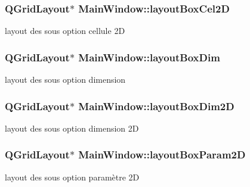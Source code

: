 \subsubsection[{\texorpdfstring{layout\+Box\+Cel2D}{layoutBoxCel2D}}]{\setlength{\rightskip}{0pt plus 5cm}Q\+Grid\+Layout$\ast$ Main\+Window\+::layout\+Box\+Cel2D\hspace{0.3cm}{\ttfamily [private]}}\hypertarget{class_main_window_a69d0a438a34120f96b7394136ee13a15}{}\label{class_main_window_a69d0a438a34120f96b7394136ee13a15}
layout des sous option cellule 2D 
\subsubsection[{\texorpdfstring{layout\+Box\+Dim}{layoutBoxDim}}]{\setlength{\rightskip}{0pt plus 5cm}Q\+Grid\+Layout$\ast$ Main\+Window\+::layout\+Box\+Dim\hspace{0.3cm}{\ttfamily [private]}}\hypertarget{class_main_window_a1827baeeedb3477f4fd4c705aedda5c1}{}\label{class_main_window_a1827baeeedb3477f4fd4c705aedda5c1}
layout des sous option dimension 
\subsubsection[{\texorpdfstring{layout\+Box\+Dim2D}{layoutBoxDim2D}}]{\setlength{\rightskip}{0pt plus 5cm}Q\+Grid\+Layout$\ast$ Main\+Window\+::layout\+Box\+Dim2D\hspace{0.3cm}{\ttfamily [private]}}\hypertarget{class_main_window_a7ab6b649b9761ce29bcda27ebbbe9ccd}{}\label{class_main_window_a7ab6b649b9761ce29bcda27ebbbe9ccd}
layout des sous option dimension 2D 
\subsubsection[{\texorpdfstring{layout\+Box\+Param2D}{layoutBoxParam2D}}]{\setlength{\rightskip}{0pt plus 5cm}Q\+Grid\+Layout$\ast$ Main\+Window\+::layout\+Box\+Param2D\hspace{0.3cm}{\ttfamily [private]}}\hypertarget{class_main_window_af5faffe7dcb929efd6cf1a1b823c99a1}{}\label{class_main_window_af5faffe7dcb929efd6cf1a1b823c99a1}
layout des sous option paramètre 2D 
